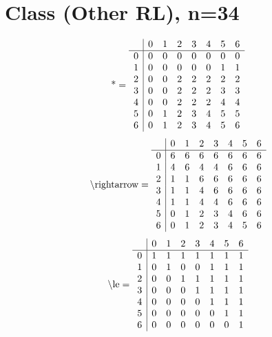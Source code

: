 \documentclass[11pt]{article}
\begin{document}
\section{Class (Other RL), n=34}
\[\text{*} = 
\begin{array}{r | r r r r r r r}
 & 0 & 1 & 2 & 3 & 4 & 5 & 6 \\ \hline
0 & 0 & 0 & 0 & 0 & 0 & 0 & 0 \\
1 & 0 & 0 & 0 & 0 & 0 & 1 & 1 \\
2 & 0 & 0 & 2 & 2 & 2 & 2 & 2 \\
3 & 0 & 0 & 2 & 2 & 2 & 3 & 3 \\
4 & 0 & 0 & 2 & 2 & 2 & 4 & 4 \\
5 & 0 & 1 & 2 & 3 & 4 & 5 & 5 \\
6 & 0 & 1 & 2 & 3 & 4 & 5 & 6 \\
\end{array}
\]
\[\text{\textbackslash rightarrow} = 
\begin{array}{r | r r r r r r r}
 & 0 & 1 & 2 & 3 & 4 & 5 & 6 \\ \hline
0 & 6 & 6 & 6 & 6 & 6 & 6 & 6 \\
1 & 4 & 6 & 4 & 4 & 6 & 6 & 6 \\
2 & 1 & 1 & 6 & 6 & 6 & 6 & 6 \\
3 & 1 & 1 & 4 & 6 & 6 & 6 & 6 \\
4 & 1 & 1 & 4 & 4 & 6 & 6 & 6 \\
5 & 0 & 1 & 2 & 3 & 4 & 6 & 6 \\
6 & 0 & 1 & 2 & 3 & 4 & 5 & 6 \\
\end{array}
\]
\[\text{\textbackslash le} = 
\begin{array}{r | r r r r r r r}
 & 0 & 1 & 2 & 3 & 4 & 5 & 6 \\ \hline
0 & 1 & 1 & 1 & 1 & 1 & 1 & 1 \\
1 & 0 & 1 & 0 & 0 & 1 & 1 & 1 \\
2 & 0 & 0 & 1 & 1 & 1 & 1 & 1 \\
3 & 0 & 0 & 0 & 1 & 1 & 1 & 1 \\
4 & 0 & 0 & 0 & 0 & 1 & 1 & 1 \\
5 & 0 & 0 & 0 & 0 & 0 & 1 & 1 \\
6 & 0 & 0 & 0 & 0 & 0 & 0 & 1 \\
\end{array}
\]
\end{document}
